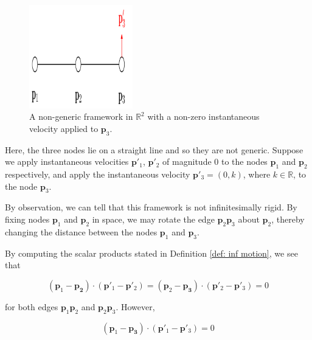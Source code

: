 \begin{figure}[htbp]
    \centering
    \includegraphics[width = 0.4\textwidth]{Chapter 2/16. generically_rigid.png}
    \caption{A non-generic framework in $\mathbb{R}^2$ with a non-zero instantaneous velocity applied to $\mathbf{p}_3$.}
    \label{fig: non-generic}
\end{figure}

\vspace{-2mm}
\begin{flushleft}
Here, the three nodes lie on a straight line and so they are not generic. Suppose we apply instantaneous velocities $\mathbf{p}'_1$, $\mathbf{p}'_2$ of magnitude 0 to the nodes $\mathbf{p}_1$ and $\mathbf{p}_2$ respectively, and apply the instantaneous velocity $\mathbf{p}'_3 = (0,k)$, where $k \in \mathbb{R}$, to the node $\mathbf{p}_3$.
\end{flushleft}

\begin{flushleft}
By observation, we can tell that this framework is not infinitesimally rigid. By fixing nodes $\mathbf{p}_1$ and $\mathbf{p}_2$ in space, we may rotate the edge $\mathbf{p}_2\mathbf{p}_3$ about $\mathbf{p}_2$, thereby changing the distance between the nodes $\mathbf{p}_1$ and $\mathbf{p}_3$. 
\end{flushleft}

\begin{flushleft}
By computing the scalar products stated in Definition \ref{def: inf motion}, we see that 
\end{flushleft}
\vspace{-0.5mm}
\[
(\mathbf{p}_1 - \mathbf{p_2}) \cdot (\mathbf{p}'_1 - \mathbf{p}'_2) = (\mathbf{p}_2 - \mathbf{p_3}) \cdot (\mathbf{p}'_2 - \mathbf{p}'_3) = 0
\]

\begin{flushleft}
for both edges $\mathbf{p}_1\mathbf{p}_2$ and $\mathbf{p}_2\mathbf{p}_3$. However, 
\end{flushleft}
\vspace{-0.5mm}
\[
(\mathbf{p}_1 - \mathbf{p_3}) \cdot (\mathbf{p}'_1 - \mathbf{p}'_3) = 0
\]


